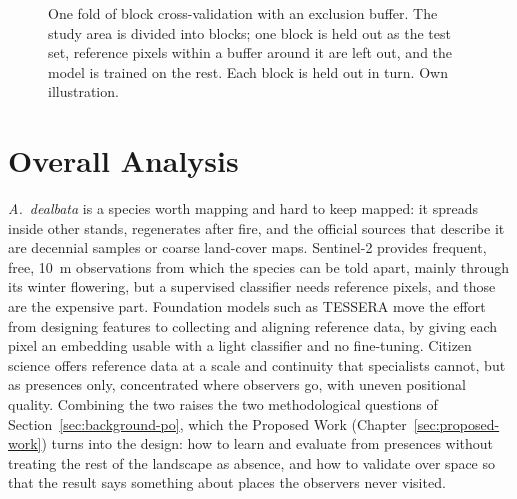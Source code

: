 \begin{figure}[htb]
\centering
{}
\caption{One fold of block cross-validation with an exclusion buffer.
The study area is divided into blocks; one block is held out as the
test set, reference pixels within a buffer around it are left out, and
the model is trained on the rest. Each block is held out in turn. Own
illustration.}
\label{fig:background-block-cv}
\end{figure}

\section{Overall Analysis}
\label{sec:background-overall}

\emph{A.~dealbata} is a species worth mapping and hard to keep mapped:
it spreads inside other stands, regenerates after fire, and the
official sources that describe it are decennial samples or coarse
land-cover maps. Sentinel-2 provides frequent, free, 10~m observations
from which the species can be told apart, mainly through its winter
flowering, but a supervised classifier needs reference pixels, and
those are the expensive part. Foundation models such as TESSERA move
the effort from designing features to collecting and aligning
reference data, by giving each pixel an embedding usable with a light
classifier and no fine-tuning. Citizen science offers reference data
at a scale and continuity that specialists cannot, but as presences
only, concentrated where observers go, with uneven positional quality.
Combining the two raises the two methodological questions of
Section~\ref{sec:background-po}, which the Proposed Work
(Chapter~\ref{sec:proposed-work}) turns into the design: how to learn
and evaluate from presences without treating the rest of the landscape
as absence, and how to validate over space so that the result says
something about places the observers never visited.
